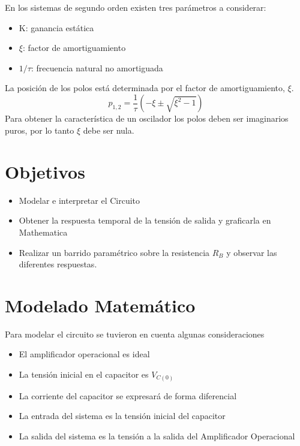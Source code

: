 \documentclass[10pt,a4paper]{article} %
\begin{document}
En los sistemas de segundo orden existen tres parámetros a considerar:
    \begin{itemize} 
    	\item K: ganancia estática
    	\item $\xi$: factor de amortiguamiento
    	\item $1/\tau$: frecuencia natural no amortiguada
    \end{itemize}
       La posición de los polos está determinada por el factor de amortiguamiento, $\xi$. 
       \begin{equation*}
       p_{1,2}=\frac{1}{\tau}\left(-\xi\pm\sqrt{\xi^2-1}\right)
       \end{equation*}
       Para obtener la característica de un oscilador los polos deben ser imaginarios puros, por lo tanto 
       $\xi$ debe ser nula. 
 

\section{Objetivos}
\begin{itemize}
    \item Modelar e interpretar el Circuito
    \item Obtener la respuesta temporal de la tensión de salida y graficarla en Mathematica
    \item Realizar un barrido paramétrico sobre la resistencia $R_B$ y observar las diferentes respuestas.
\end{itemize}

\section{Modelado Matemático}
Para modelar el circuito se tuvieron en cuenta algunas consideraciones

\begin{itemize}
    \item El amplificador operacional es ideal
    \item La tensión inicial en el capacitor es $V_{C(0)}$
    \item La corriente del capacitor se expresará de forma diferencial
    \item La entrada del sistema es la tensión inicial del capacitor
    \item La salida del sistema es la tensión a la salida del Amplificador Operacional
\end{itemize}
\end{document}
